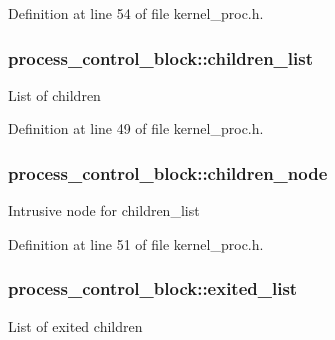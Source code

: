 Definition at line 54 of file kernel\+\_\+proc.\+h.

\subsubsection[{\texorpdfstring{children\+\_\+list}{children_list}}]{ process\+\_\+control\+\_\+block\+::children\+\_\+list}\hypertarget{structprocess__control__block_a79b0dd70bbfff1d7da6ab4cbbd00eb1f}{}\label{structprocess__control__block_a79b0dd70bbfff1d7da6ab4cbbd00eb1f}
List of children 

Definition at line 49 of file kernel\+\_\+proc.\+h.

\subsubsection[{\texorpdfstring{children\+\_\+node}{children_node}}]{ process\+\_\+control\+\_\+block\+::children\+\_\+node}\hypertarget{structprocess__control__block_a5b9aeabcc3d676cda39eb563a4cc5bd9}{}\label{structprocess__control__block_a5b9aeabcc3d676cda39eb563a4cc5bd9}
Intrusive node for {\ttfamily children\+\_\+list} 

Definition at line 51 of file kernel\+\_\+proc.\+h.

\subsubsection[{\texorpdfstring{exited\+\_\+list}{exited_list}}]{ process\+\_\+control\+\_\+block\+::exited\+\_\+list}\hypertarget{structprocess__control__block_afddb936103b136214462e1ed870c4c70}{}\label{structprocess__control__block_afddb936103b136214462e1ed870c4c70}
List of exited children 

